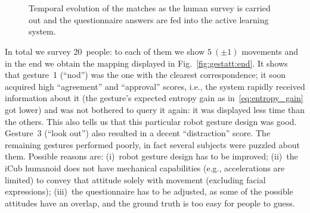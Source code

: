 \begin{figure}
\centering
{} \quad
%
 \\
%
 \quad
%
 \\
%
 \quad
%
%
\caption[Temporal evolution of the \gestatt{} matches as the human survey is carried out.]{Temporal evolution of the \gestatt{} matches as the human survey is carried out and the questionnaire answers are fed into the active learning system.}
\label{fig:gestatt}
\end{figure}

In total we survey 20~people: to each of them we show $5~(\pm 1)$ movements and in the end we obtain the mapping displayed in Fig.~\ref{fig:gestatt:end}.
It shows that gesture~1 (``nod'') was the one with the clearest \gestatt{} correspondence; it soon acquired high ``agreement'' and ``approval'' scores, i.e., the system rapidly received information about it (the gesture's expected entropy gain as in~\eqref{eq:entropy_gain} got lower) and was not bothered to query it again: it was displayed less time than the others.
This also tells us that this particular robot gesture design was good.
Gesture~3 (``look out'') also resulted in a decent ``distraction'' score.
The remaining gestures performed poorly, in fact several subjects were puzzled about them.
Possible reasons are: (i)~robot gesture design has to be improved; (ii)~the iCub humanoid does not have mechanical capabilities (e.g., accelerations are limited) to convey that attitude solely with movement (excluding facial expressions); (iii)~the questionnaire has to be adjusted, as some of the possible attitudes have an overlap, and the ground truth is too easy for people to guess.

